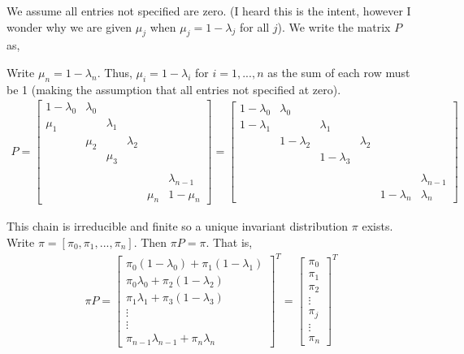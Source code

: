 \begin{solution}[Solution]
We assume all entries not specified are zero. (I heard this is the intent, however I wonder why we are given \( \mu_j\) when \( \mu_j=1-\lambda_j \) for all \( j \)). We write the matrix \( P \) as,

Write \( \mu_n=1-\lambda_n  \). Thus, \( \mu_i=1-\lambda_i \) for \( i=1, ..., n \) as the sum of each row must be 1 (making the assumption that all entries not specified at zero). 
    {\tiny
    \begin{align*}
    P = \left[\begin{array}{rrrrrr}
        1-\lambda_0 & \lambda_0 & & &\\
        \mu_1 & & \lambda_1 & & \\
        & \mu_2 & & \lambda_2 & \\
        & & \mu_3 \\\\
        & & & & & \lambda_{n-1} \\
        & & & & \mu_n & 1-\mu_n
    \end{array}\right]
      = \left[\begin{array}{rrrrrr}
        1-\lambda_0 & \lambda_0 & & &\\
        1-\lambda_1 & & \lambda_1 & & \\
        & 1-\lambda_2 & & \lambda_2 & \\
        && 1-\lambda_3\\\\
        & & & & & \lambda_{n-1} \\
        & & & & 1-\lambda_n & \lambda_n
    \end{array}\right]
\end{align*}
    }

This chain is irreducible and finite so a unique invariant distribution \( \pi \) exists. Write \( \pi=[\pi_0,\pi_1, ..., \pi_n] \). Then \( \pi P = \pi \). That is,
\begin{align*}
    \pi P = \left[\begin{array}{r}
        \pi_0(1-\lambda_0)+\pi_1(1-\lambda_1) \\
        \pi_0 \lambda_0 + \pi_2(1-\lambda_2) \\ 
        \pi_1\lambda_1+\pi_3(1-\lambda_3) \\
        \vdots \\ 
        \vdots \\
        \pi_{n-1}\lambda_{n-1}+\pi_n\lambda_n
    \end{array}\right]^T
= \left[\begin{array}{r}
    \pi_0 \\ 
    \pi_1 \\
    \pi_2 \\
    \vdots \\
    \pi_j \\
    \vdots \\
    \pi_n
\end{array}\right]^T
\end{align*}


\end{solution}

